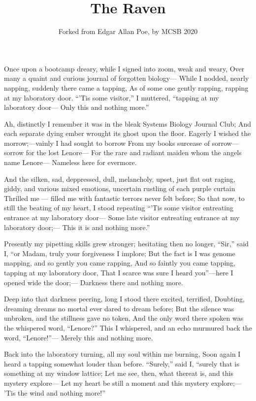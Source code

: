 \documentclass{article}
\title{The Raven}
\author{Forked from Edgar Allan Poe, by MCSB 2020}
\begin{document}
\maketitle

Once upon a bootcamp dreary, while I signed into zoom, weak and weary, 
Over many a quaint and curious journal of forgotten biology—
While I nodded, nearly napping, suddenly there came a tapping,
As of some one gently rapping, rapping at my laboratory door.
“’Tis some visitor,” I muttered, “tapping at my laboratory door—
Only this and nothing more.”

Ah, distinctly I remember it was in the bleak Systems Biology Journal Club;
And each separate dying ember wrought its ghost upon the floor.
Eagerly I wished the morrow;—vainly I had sought to borrow
From my books surcease of sorrow—sorrow for the lost Lenore—
For the rare and radiant maiden whom the angels name Lenore—
Nameless here for evermore.

And the silken, sad, deppressed, dull, melancholy, upset, just flat out raging, giddy, and various mixed emotions, uncertain rustling of each purple curtain
Thrilled me — filled me with fantastic terrors never felt before;
So that now, to still the beating of my heart, I stood repeating
“’Tis some visitor entreating entrance at my laboratory door—
Some late visitor entreating entrance at my laboratory door;—
This it is and nothing more.”


Presently my pipetting skills grew stronger; hesitating then no longer,
“Sir,” said I, “or Madam, truly your forgiveness I implore;
But the fact is I was genome mapping, and so gently you came rapping,
And so faintly you came tapping, tapping at my laboratory door,
That I scarce was sure I heard you”—here I opened wide the door;—
Darkness there and nothing more.

Deep into that darkness peering, long I stood there excited, terrified,
Doubting, dreaming dreams no mortal ever dared to dream before;
But the silence was unbroken, and the stillness gave no token,
And the only word there spoken was the whispered word, “Lenore?”
This I whispered, and an echo murmured back the word, “Lenore!”—
Merely this and nothing more.

Back into the laboratory turning, all my soul within me burning,
Soon again I heard a tapping somewhat louder than before.
“Surely,” said I, “surely that is something at my window lattice;
Let me see, then, what thereat is, and this mystery explore—
Let my heart be still a moment and this mystery explore;—
’Tis the wind and nothing more!”
\end{document}
